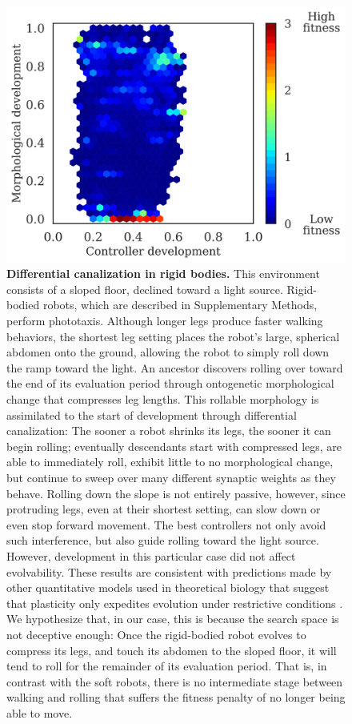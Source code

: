 \begin{figure}
\centering
\includegraphics[width=0.65\linewidth]{Chapter04/FigS5}
\caption{\label{fig:S5}\textbf{Differential canalization in rigid bodies.} 
This environment consists of a sloped floor, declined toward a light source. 
Rigid-bodied robots, which are described in Supplementary Methods, perform phototaxis.
Although longer legs produce faster walking behaviors, the shortest leg setting places the robot's large, spherical abdomen onto the ground, allowing the robot to simply roll down the ramp toward the light. 
An ancestor discovers rolling over toward the end of its evaluation period through ontogenetic morphological change that compresses leg lengths. 
This rollable morphology is assimilated to the start of development through differential canalization: The sooner a robot shrinks its legs, the sooner it can begin rolling; eventually descendants start with compressed legs, are able to immediately roll, exhibit little to no morphological change, but continue to sweep over many different synaptic weights as they behave. 
Rolling down the slope is not entirely passive, however, since protruding legs, even at their shortest setting, can slow down or even stop forward movement. 
The best controllers not only avoid such interference, but also guide rolling toward the light source. 
However, development in this particular case did not affect evolvability. 
These results are consistent with predictions made by other quantitative models used in theoretical biology that suggest that plasticity only expedites evolution under restrictive conditions \cite{ancel2000undermining}. 
We hypothesize that, in our case, this is because the search space is not deceptive enough: Once the rigid-bodied robot evolves to compress its legs, and touch its abdomen to the sloped floor, it will tend to roll for the remainder of its evaluation period.
That is, in contrast with the soft robots, there is no intermediate stage between walking and rolling that suffers the fitness penalty of no longer being able to move.
}
\end{figure}





